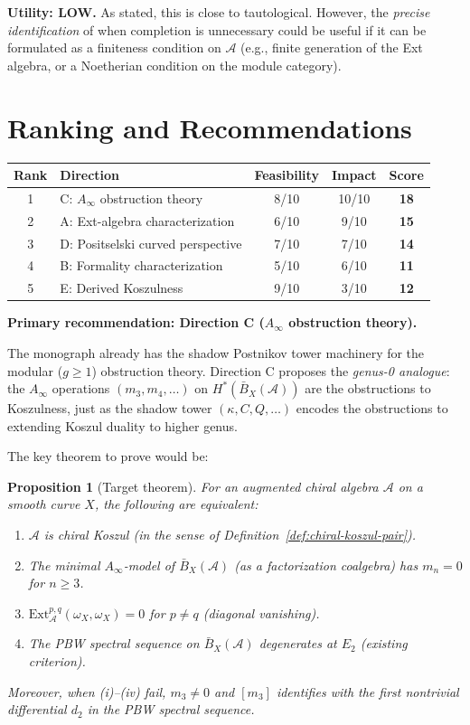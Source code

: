 \documentclass[11pt]{article}
\newtheorem{proposition}[conjecture]{Proposition}
\theoremstyle{remark}
\newcommand{\cA}{\mathcal{A}}
\newcommand{\barB}{\bar{B}}
\newcommand{\Ext}{\mathrm{Ext}}
\begin{document}
\textbf{Utility: LOW.}  As stated, this is close to tautological.  However, the \emph{precise identification} of when completion is unnecessary could be useful if it can be formulated as a finiteness condition on $\cA$ (e.g., finite generation of the Ext algebra, or a Noetherian condition on the module category).

\section{Ranking and Recommendations}

\begin{center}
\renewcommand{\arraystretch}{1.3}
\begin{tabular}{|c|l|c|c|c|}
\hline
\textbf{Rank} & \textbf{Direction} & \textbf{Feasibility} & \textbf{Impact} & \textbf{Score} \\
\hline
1 & C: $A_\infty$ obstruction theory & 8/10 & 10/10 & \textbf{18} \\
2 & A: Ext-algebra characterization & 6/10 & 9/10 & \textbf{15} \\
3 & D: Positselski curved perspective & 7/10 & 7/10 & \textbf{14} \\
4 & B: Formality characterization & 5/10 & 6/10 & \textbf{11} \\
5 & E: Derived Koszulness & 9/10 & 3/10 & \textbf{12} \\
\hline
\end{tabular}
\end{center}

\textbf{Primary recommendation: Direction C ($A_\infty$ obstruction theory).}

The monograph already has the shadow Postnikov tower machinery for the modular ($g \geq 1$) obstruction theory.  Direction C proposes the \emph{genus-0 analogue}: the $A_\infty$ operations $(m_3, m_4, \ldots)$ on $H^*(\barB_X(\cA))$ are the obstructions to Koszulness, just as the shadow tower $(\kappa, C, Q, \ldots)$ encodes the obstructions to extending Koszul duality to higher genus.

The key theorem to prove would be:

\begin{proposition}[Target theorem]
For an augmented chiral algebra $\cA$ on a smooth curve $X$, the following are equivalent:
\begin{enumerate}[label=(\roman*)]
\item $\cA$ is chiral Koszul (in the sense of Definition~\ref*{def:chiral-koszul-pair}).
\item The minimal $A_\infty$-model of $\barB_X(\cA)$ (as a factorization coalgebra) has $m_n = 0$ for $n \geq 3$.
\item $\Ext^{p,q}_\cA(\omega_X, \omega_X) = 0$ for $p \neq q$ (diagonal vanishing).
\item The PBW spectral sequence on $\barB_X(\cA)$ degenerates at $E_2$ (existing criterion).
\end{enumerate}
Moreover, when (i)--(iv) fail, $m_3 \neq 0$ and $[m_3]$ identifies with the first nontrivial differential $d_2$ in the PBW spectral sequence.
\end{proposition}
\end{document}
